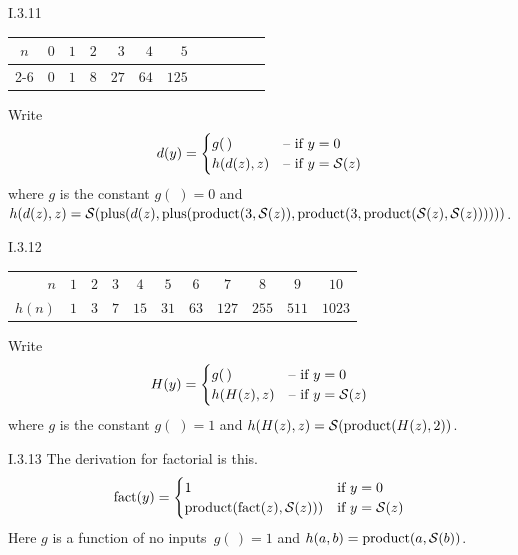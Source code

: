 \begin{ans}{I.3.11}
\begin{exparts}
\item
\begin{center}
\begin{tabular}{r|*{11}{r}}
  \multicolumn{1}{c}{$n$}
    &$0$ &$1$ &$2$ &$3$ &$4$  &$5$  \\
   \cline{2-6}
  \multicolumn{1}{c}{$t(n)$}
    &$0$ &$1$ &$8$ &$27$ &$64$ &$125$
\end{tabular}
\end{center}
\item Write
\begin{equation*}
  d(y)=
  \begin{cases}
  g(\,)  &\text{-- if $y=0$}  \\
  h(d(z),z)  &\text{-- if $y=\operatorname{\mathcal{S}}(z)$}
  \end{cases}
\end{equation*}
where $g$ is the constant $g(\;)=0$ and
$h(d(z),z)=\operatorname{\mathcal{S}}(\operatorname{plus}(d(z),\operatorname{plus}(\operatorname{product}(3,\operatorname{\mathcal{S}}(z)),\operatorname{product}(3,\operatorname{product}(\operatorname{\mathcal{S}}(z),\operatorname{\mathcal{S}}(z))))))$.
\end{exparts}
\end{ans}
%
\begin{ans}{I.3.12}
\begin{exparts}
\item
\begin{center}
\begin{tabular}{r|cccccccccc}
  $n$    &$1$ &$2$ &$3$ &$4$  &$5$  &$6$  &$7$   &$8$   &$9$   &$10$    \\
  $h(n)$ &$1$ &$3$ &$7$ &$15$ &$31$ &$63$ &$127$ &$255$ &$511$ &$1023$  \\
\end{tabular}
\end{center}
\item Write
\begin{equation*}
  H(y)=
  \begin{cases}
  g(\,)  &\text{-- if $y=0$}  \\
  h(H(z),z)  &\text{-- if $y=\operatorname{\mathcal{S}}(z)$}
  \end{cases}
\end{equation*}
where $g$ is the constant $g(\;)=1$ and
$h(H(z),z)=\operatorname{\mathcal{S}}(\operatorname{product}(H(z),2))$.
\end{exparts}
\end{ans}
%
\begin{ans}{I.3.13}
The derivation for factorial is this.
\begin{equation*}
  \operatorname{fact}(y)=\begin{cases}
              1                  &\text{if $y=0$}  \\
              \operatorname{product}(\operatorname{fact}(z),\operatorname{\mathcal{S}}(z))) &\text{if $y=\operatorname{\mathcal{S}}(z)$}
            \end{cases}
\end{equation*}
Here $g$ is a function of no inputs~$g(\,)=1$ and
$h(a,b)=\operatorname{product}(a,\operatorname{\mathcal{S}}(b))$.
\end{ans}

